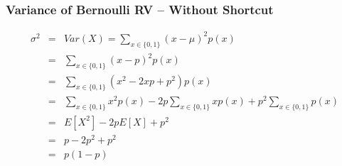 \documentclass[handout]{beamer}
\begin{document}
\begin{frame}
\frametitle{Variance of Bernoulli RV -- Without Shortcut}

\vspace{-0.2in}
\begin{eqnarray*}
	\sigma^2 &=& Var(X) = \sum_{x \in \{0,1\}} (x - \mu)^2 p(x)\\
	 &=& \sum_{x \in \{0,1\}} (x - p)^2 p(x)\\
	 & =& \sum_{x \in \{0,1\}} (x^2-2xp+p^2)p(x) \\ 
	 &= & \sum_{x \in \{0,1\}} x^2 p(x) - 2p \sum_{x \in \{0,1\}} xp(x) + p^2\sum_{x \in \{0,1\}} p(x)\\
	 &=& E[X^2] - 2p E[X] + p^2\\
	 &=& p - 2p^2 + p^2\\
	 &=&p(1-p)
\end{eqnarray*}



\end{frame}
\end{document}
